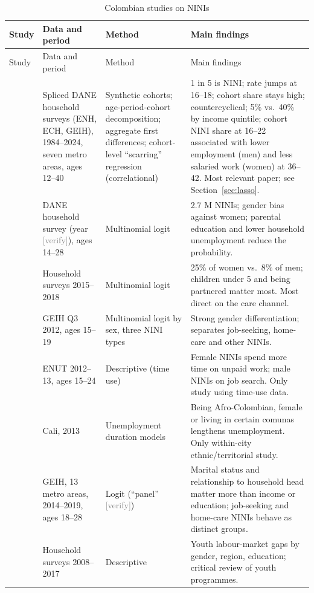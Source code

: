 \documentclass[11pt]{article}
\newcommand{\verify}{\textcolor{gray}{\textsf{\footnotesize[verify]}}}
\begin{document}
\begingroup\small
\begin{longtable}{P{3.0cm}P{3.6cm}P{2.6cm}P{5.6cm}}
\caption{Colombian studies on NINIs}\label{tab:litcol}\\
\toprule
Study & Data and period & Method & Main findings \\
\midrule
\endfirsthead
\toprule
Study & Data and period & Method & Main findings \\
\midrule
\endhead
\bottomrule
\endfoot
\citet{lasso2026} & Spliced DANE household surveys (ENH, ECH, GEIH), 1984--2024, seven metro areas, ages 12--40 & Synthetic cohorts; age-period-cohort decomposition; aggregate first differences; cohort-level ``scarring'' regression (correlational) & 1 in 5 is NINI; rate jumps at 16--18; cohort share stays high; countercyclical; 5\% vs.\ 40\% by income quintile; cohort NINI share at 16--22 associated with lower employment (men) and less salaried work (women) at 36--42. Most relevant paper; see Section~\ref{sec:lasso}. \\
\citet{sanchez2021} & DANE household survey (year \verify), ages 14--28 & Multinomial logit & 2.7 M NINIs; gender bias against women; parental education and lower household unemployment reduce the probability. \\
\citet{lopez2020} & Household surveys 2015--2018 & Multinomial logit & 25\% of women vs.\ 8\% of men; children under 5 and being partnered matter most. Most direct on the care channel. \\
\citet{hernandez2016} & GEIH Q3 2012, ages 15--19 & Multinomial logit by sex, three NINI types & Strong gender differentiation; separates job-seeking, home-care and other NINIs. \\
\citet{ochoa2015} & ENUT 2012--13, ages 15--24 & Descriptive (time use) & Female NINIs spend more time on unpaid work; male NINIs on job search. Only study using time-use data. \\
\citet{mora2017} & Cali, 2013 & Unemployment duration models & Being Afro-Colombian, female or living in certain comunas lengthens unemployment. Only within-city ethnic/territorial study. \\
\citet{lenis2021} & GEIH, 13 metro areas, 2014--2019, ages 18--28 & Logit (``panel'' \verify) & Marital status and relationship to household head matter more than income or education; job-seeking and home-care NINIs behave as distinct groups. \\
\citet{ham2021} & Household surveys 2008--2017 & Descriptive & Youth labour-market gaps by gender, region, education; critical review of youth programmes. \\

\end{longtable}
\end{document}

